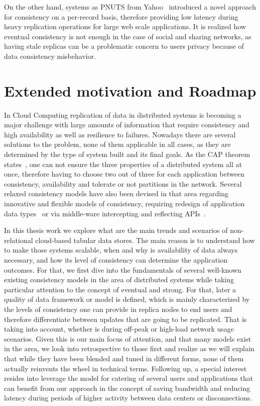 On the other hand, systems as PNUTS from Yahoo~\cite{Cooper:2008} introduced a novel approach for consistency on a per-record basis, therefore providing low latency during heavy replication operations for large web scale applications. It is realized how eventual consistency is not enough in the case of social and sharing networks, as having stale replicas can be a problematic concern to users privacy because of data consistency misbehavior.


\section{Extended motivation and Roadmap}
In Cloud Computing replication of data in distributed systems is becoming a major challenge with large amounts of information that require consistency and high availability as well as resilience to failures. Nowadays there are several solutions to the problem, none of them applicable in all cases, as they are determined by the type of system built and its final goals. As the CAP theorem states~\cite{Brewer:2002}, one can not ensure the three properties of a distributed system all at once, therefore having to choose two out of three for each application between consistency, availability and tolerate or not partitions in the network. Several relaxed consistency models have also been devised in that area regarding innovative and flexible models of consistency, requiring redesign of application data types~\cite{Saphiro:2011} or via middle-ware intercepting and reflecting APIs~\cite{Vfc3:2012}.

In this thesis work we explore what are the main trends and scenarios of non-relational cloud-based tabular data stores. The main reason is to understand how to make those systems scalable, when and why is availability of data always necessary, and how its level of consistency can determine the application outcomes. For that, we first dive into the fundamentals of several well-known existing consistency models in the area of distributed systems while taking particular attention to the concept of eventual and strong. For that, later a quality of data framework or model is defined, which is mainly characterized by the levels of consistency one can provide in replica nodes to end users and therefore differentiate between updates that are going to be replicated. That is taking into account, whether is during off-peak or high-load network usage scenarios. Given this is our main focus of attention, and that many models exist in the area, we look into retrospective to those first and realize as we will explain that while they have been blended and tuned in different forms, none of them actually reinvents the wheel in technical terms. Following up, a special interest resides into leverage the model for catering of several users and applications that can benefit from our approach in the concept of saving bandwidth and reducing latency during periods of higher activity between data centers or disconnections.

